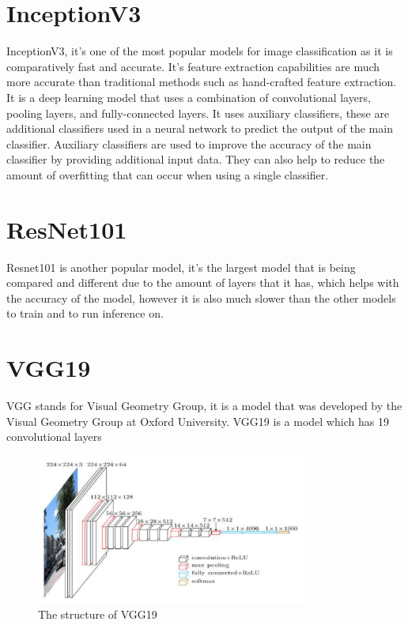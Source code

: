 \documentclass[]{final_report}
\begin{document}


\section{InceptionV3}
InceptionV3\cite{DBLP:journals/corr/SzegedyVISW15}, it's one of the most popular models for image classification as it is comparatively fast and accurate.
It's feature extraction capabilities are much more accurate than traditional methods such as hand-crafted feature extraction. 
It is a deep learning model that uses a combination of convolutional layers, pooling layers, and fully-connected layers. 
It uses auxiliary classifiers, these are additional classifiers used in a neural network to predict the output of the main classifier. Auxiliary classifiers are used to improve the accuracy of the main classifier by providing additional input data. 
They can also help to reduce the amount of overfitting that can occur when using a single classifier.

\section{ResNet101}
Resnet101\cite{DBLP:journals/corr/HeZRS15} is another popular model, it's the largest model that is being compared and different due to the amount of layers that it has, 
which helps with the accuracy of the model, however it is also much slower than the other models to train and to run inference on.

\section{VGG19}
VGG stands for Visual Geometry Group, it is a model that was developed by the Visual Geometry Group at Oxford University.
VGG19\cite{Simonyan15} is a model which has 19 convolutional layers

\begin{figure}[ht!]
  \centering
  \includegraphics[width=0.8\textwidth]{images/VGG19-architecture.png}
  \caption{The structure of VGG19\cite{Simonyan15}}
  \label{fig:vgg19-structure}
\end{figure}
\end{document}
